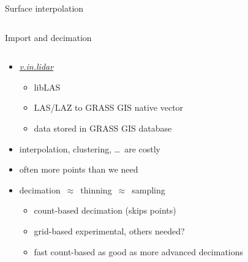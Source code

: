 \documentclass[xcolor={dvipsnames,usenames},beamer,aspectratio=43]{beamer}
\newcommand{\gmodule}[1]{\href{http://grass.osgeo.org/grass71/manuals/#1.html}{\emph{#1}}}
\begin{document}
\begin{frame}{Surface interpolation}
\begin{columns}
\begin{column}{0.4\textwidth}
\end{column}
\end{columns}

\end{frame}


\begin{frame}{Import and decimation}

\begin{columns}
\begin{column}{0.58\textwidth}

\begin{itemize}
  \item \gmodule{v.in.lidar}
  \begin{itemize}
   \item libLAS
   \item LAS/LAZ to GRASS GIS native vector
    \item data stored in GRASS GIS database
  \end{itemize}
  \item interpolation, clustering, \ldots\ are costly
  \item often more points than we need
  \item decimation~$\approx$~thinning~$\approx$~sampling
  \begin{itemize}
    \item count-based decimation (skips points)
    \item grid-based experimental, others needed?  %
    \item fast count-based as good as more advanced decimations
  \end{itemize}
\end{itemize}

\end{column}
\begin{column}{0.22\textwidth}



\end{column}
\end{columns}
\end{frame}
\end{document}
